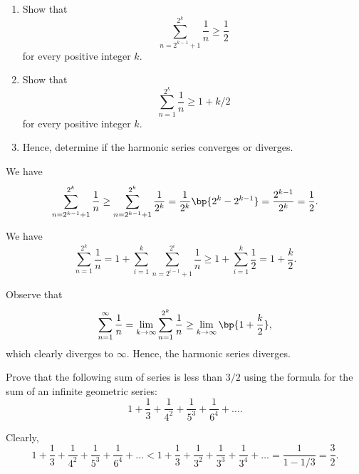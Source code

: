 \begin{problem}
    \begin{enumerate}
        \item Show that \[\sum_{n = 2^{k-1} + 1}^{2^k} \frac1n \geq \frac12\] for every positive integer $k$.
        \item Show that \[\sum_{n = 1}^{2^k} \frac1n \geq 1 + k/2\] for every positive integer $k$.
        \item Hence, determine if the harmonic series converges or diverges.
    \end{enumerate}
\end{problem}
\begin{solution}
    \begin{ppart}
        We have \[\sum_{n = 2^{k-1} + 1}^{2^k} \frac1n \geq \sum_{n = 2^{k-1} + 1}^{2^k} \frac1{2^k} = \frac1{2^k} \bp{2^{k} - 2^{k-1}} = \frac{2^{k-1}}{2^k} = \frac12.\]
    \end{ppart}
    \begin{ppart}
        We have \[\sum_{n = 1}^{2^k} \frac1n = 1 + \sum_{i = 1}^k \sum_{n = 2^{i-1} + 1}^{2^i} \frac1n \geq 1 + \sum_{i = 1}^k \frac12 = 1 + \frac{k}{2}.\]
    \end{ppart}
    \begin{ppart}
        Observe that \[\sum_{n = 1}^\infty \frac1n = \lim_{k \to \infty} \sum_{n = 1}^{2^k} \frac1n \geq \lim_{k \to \infty} \bp{1 + \frac{k}2},\] which clearly diverges to $\infty$. Hence, the harmonic series diverges.
    \end{ppart}
\end{solution}

\begin{problem}
    Prove that the following sum of series is less than $3/2$ using the formula for the sum of an infinite geometric series: \[1 + \frac13 + \frac1{4^2} + \frac1{5^3} + \frac1{6^4} + \dots.\]
\end{problem}
\begin{ppart}
    Clearly, \[1 + \frac13 + \frac1{4^2} + \frac1{5^3} + \frac1{6^4} + \dots < 1 + \frac13 + \frac1{3^2} + \frac1{3^3} + \frac1{3^4} + \dots = \frac1{1 - 1/3} = \frac32.\]
\end{ppart}

